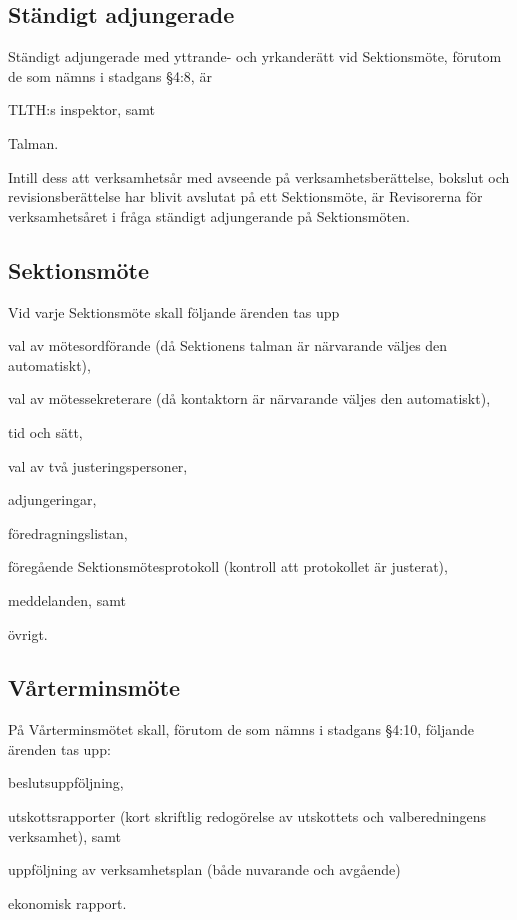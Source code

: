 \documentclass[10pt]{article}
\begin{document}
\subsection{Ständigt adjungerade}

Ständigt adjungerade med yttrande- och yrkanderätt vid Sektionsmöte,
förutom de som nämns i stadgans §4:8, är

\begin{alphlist}
    \item TLTH:s inspektor, samt
    \item Talman.
\end{alphlist}

Intill dess att verksamhetsår med avseende på verksamhetsberättelse,
bokslut och revisionsberättelse har blivit avslutat på ett Sektionsmöte,
är Revisorerna för verksamhetsåret i fråga ständigt adjungerande på
Sektionsmöten.

\subsection{Sektionsmöte}

Vid varje Sektionsmöte skall följande ärenden tas upp

\begin{alphlist}
    \item val av mötesordförande (då Sektionens talman är närvarande
        väljes den automatiskt),
    \item val av mötessekreterare (då kontaktorn är närvarande väljes
        den automatiskt),
    \item tid och sätt,
    \item val av två justeringspersoner,
    \item adjungeringar,
    \item föredragningslistan,
    \item föregående Sektionsmötesprotokoll (kontroll att protokollet
        är justerat),
    \item meddelanden, samt
    \item övrigt.
\end{alphlist}

\subsection{Vårterminsmöte}

På Vårterminsmötet skall, förutom de som nämns i stadgans §4:10,
följande ärenden tas upp:
\begin{alphlist}
    \item beslutsuppföljning,
    \item utskottsrapporter (kort skriftlig redogörelse av utskottets och
        valberedningens verksamhet), samt
    \item uppföljning av verksamhetsplan (både nuvarande och avgående)
    \item ekonomisk rapport.
\end{alphlist}
\end{document}
